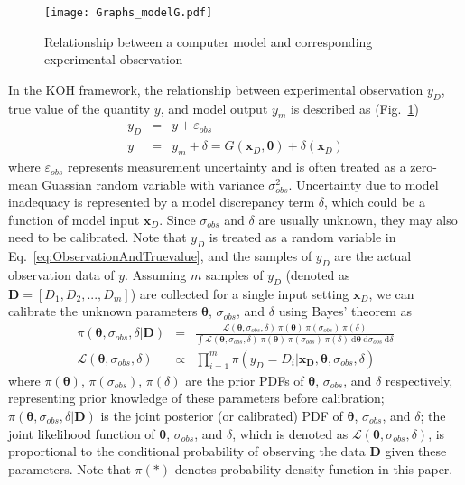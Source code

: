\documentclass[preprint,review,12pt,3p]{elsarticle}
\begin{document}
\begin{figure}[h!]
\begin{center}
\texttt{[image: Graphs\_modelG.pdf]}\label{fig:modelG}
\end{center}
\caption{Relationship between a computer model and corresponding experimental observation}
\label{fig:example-1}
\end{figure}

In the KOH framework, the relationship between experimental observation $y_D$, true value of the quantity $y$, and model output $y_m$ is described as (Fig.~\ref{fig:example-1})
\begin{eqnarray}
y_D &=& y + \varepsilon_{obs} \label{eq:ObservationAndTruevalue}\\
y &=& y_m+\delta = G(\boldsymbol{x}_D, \boldsymbol{\theta})+\delta(\boldsymbol{x}_D) \label{eq:KOHrelation}
\end{eqnarray}
where $\varepsilon_{obs}$ represents measurement uncertainty and is often treated as a zero-mean Guassian random variable with variance $\sigma_{obs}^2$. Uncertainty due to model inadequacy is represented by a model discrepancy term $\delta$, which could be a function of model input $\boldsymbol{x}_D$. Since $\sigma_{obs}$ and $\delta$ are usually unknown, they may also need to be calibrated. Note that $y_D$ is treated as a random variable in Eq.~\ref{eq:ObservationAndTruevalue}, and the samples of $y_D$ are the actual observation data of $y$. Assuming $m$ samples of $y_D$ (denoted as $\boldsymbol{D}=[D_1, D_2, ..., D_m]$) are collected for a single input setting $\boldsymbol{x}_D$, we can calibrate the unknown parameters $\boldsymbol{\theta}$, $\sigma_{obs}$, and $\delta$ using Bayes' theorem as
\begin{eqnarray}\label{eq:Bayes}
\pi(\boldsymbol{\theta},\sigma_{obs},\delta| \boldsymbol{D}) &=& \frac{\mathcal{L}(\boldsymbol{\theta},\sigma_{obs},\delta) \ \pi(\boldsymbol{\theta}) \ \pi(\sigma_{obs}) \ \pi(\delta)}{\int \mathcal{L}(\boldsymbol{\theta},\sigma_{obs},\delta) \ \pi(\boldsymbol{\theta}) \ \pi(\sigma_{obs}) \ \pi(\delta) \ \mathrm{d} \boldsymbol{\theta} \ \mathrm{d} \sigma_{obs} \ \mathrm{d} \delta} \nonumber\\
\mathcal{L}(\boldsymbol{\theta},\sigma_{obs},\delta) &\propto& \prod_{i=1}^{m}\pi( y_D=D_i|\boldsymbol{\boldsymbol{x}_D, \theta},\sigma_{obs},\delta)
\end{eqnarray}
where $\pi(\boldsymbol{\theta})$, $\pi(\sigma_{obs})$, $\pi(\delta)$ are the prior PDFs of $\boldsymbol{\theta}$, $\sigma_{obs}$, and $\delta$ respectively, representing prior knowledge of these parameters before calibration; $\pi(\boldsymbol{\theta},\sigma_{obs},\delta | \boldsymbol{D})$ is the joint posterior (or calibrated) PDF of $\boldsymbol{\theta}$, $\sigma_{obs}$, and $\delta$; the joint likelihood function of $\boldsymbol{\theta}$, $\sigma_{obs}$, and $\delta$, which is denoted as $\mathcal{L}(\boldsymbol{\theta},\sigma_{obs},\delta)$, is proportional to  the conditional probability of observing the data $\boldsymbol{D}$ given these parameters. Note that $\pi(*)$ denotes probability density function in this paper.
\end{document}
